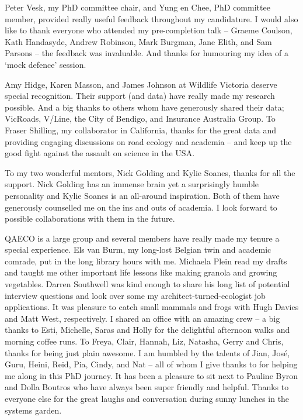 \documentclass[titlesmallcaps,copyrightpage,examinerscopy]{uomthesis}
\begin{document}
Peter Vesk, my PhD committee chair, and Yung en Chee, PhD committee member, provided really useful feedback throughout my candidature. I would also like to thank everyone who attended my pre-completion talk -- Graeme Coulson, Kath Handasyde, Andrew Robinson, Mark Burgman, Jane Elith, and Sam Parsons -- the feedback was invaluable. And thanks for humouring my idea of a `mock defence' session.

Amy Hidge, Karen Masson, and James Johnson at Wildlife Victoria deserve special recognition. Their support (and data) have really made my research possible. And a big thanks to others whom have generously shared their data; VicRoads, V/Line, the City of Bendigo, and Insurance Australia Group. To Fraser Shilling, my collaborator in California, thanks for the great data and providing engaging discussions on road ecology and academia -- and keep up the good fight against the assault on science in the USA.

To my two wonderful mentors, Nick Golding and Kylie Soanes, thanks for all the support. Nick Golding has an immense brain yet a surprisingly humble personality and Kylie Soanes is an all-around inspiration. Both of them have generously counselled me on the ins and outs of academia. I look forward to possible collaborations with them in the future.

QAECO is a large group and several members have really made my tenure a special experience. Els van Burm, my long-lost Belgian twin and academic comrade, put in the long library hours with me. Michaela Plein read my drafts and taught me other important life lessons like making granola and growing vegetables. Darren Southwell was kind enough to share his long list of potential interview questions and look over some my architect-turned-ecologist job applications. It was pleasure to catch small mammals and frogs with Hugh Davies and Matt West, respectively. I shared an office with an amazing crew -- a big thanks to Esti, Michelle, Saras and Holly for the delightful afternoon walks and morning coffee runs. To Freya, Clair, Hannah, Liz, Natasha, Gerry and Chris, thanks for being just plain awesome. I am humbled by the talents of Jian, Jos\'e, Guru, Heini, Reid, Pia, Cindy, and Nat -- all of whom I give thanks to for helping me along in this PhD journey. It has been a pleasure to sit next to Pauline Byron and Dolla Boutros who have always been super friendly and helpful. Thanks to everyone else for the great laughs and conversation during sunny lunches in the systems garden.
\end{document}
